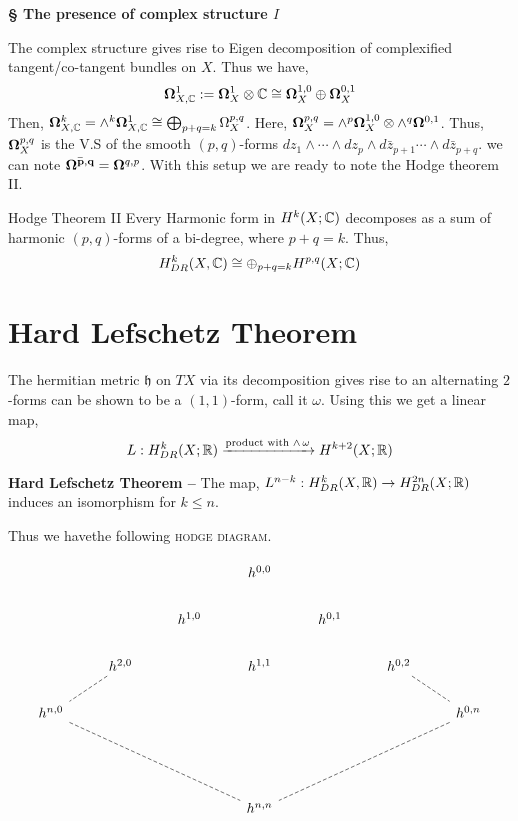 \documentclass[11pt]{article}
\begin{document}
\vspace*{0.2cm}

\noindent \textbf{\textcolor{darkcerulean}{\S}  The presence of complex structure $I$}

\vspace*{0.2cm}

\noindent The complex structure gives rise to  Eigen decomposition of complexified tangent/co-tangent bundles on $X$. Thus we have, 
$$\mathbf{\Omega}^{1}_{X,\mathbb{C}}:= \mathbf{\Omega}^1_{X}\otimes \mathbb{C} \cong \mathbf{\Omega}_X^{1,0} \oplus \mathbf{\Omega}_X^{0,1}$$
Then, $\mathbf{\Omega}_{X,\mathbb{C}}^k= \wedge^k \mathbf{\Omega}^1_{X,\mathbb{C}}\cong \bigoplus_{p+q=k}\Omega^{p,q}_{X}$. Here, $\mathbf{\Omega}_{X}^{p,q} = \wedge^p \mathbf{\Omega}^{1,0}_X \otimes \wedge^q \mathbf{\Omega}^{0,1}$. Thus, $\mathbf{\Omega}_X^{p,q}$ is the V.S of the smooth $(p,q)$-forms $dz_1\wedge\cdots \wedge dz_p \wedge d\bar{z}_{p+1} \cdots \wedge d\bar{z}_{p+q}$. we can note $\bar{\mathbf{\Omega}^{p,q}} = \mathbf{\Omega}^{q,p}$. With this setup we are ready to note the Hodge theorem II. 

\begin{Thm}{Hodge Theorem II}{}
    \hspace*{0.1cm} Every Harmonic form in $H^k(X;\mathbb{C})$ decomposes as a sum of harmonic $(p,q)$-forms of a bi-degree, where $p+q=k$. Thus, \[H^k_{DR}(X,\mathbb{C})\cong \oplus_{p+q=k} H^{p,q}(X;\mathbb{C})\]
\end{Thm}


\section{Hard Lefschetz Theorem}

The hermitian metric $\mathfrak{h}$ on $TX$ via its decomposition gives rise to an alternating $2$-forms can be shown to be a $(1,1)$-form, call it $\omega$. Using this we get a linear map,
 $$L: H^{k}_{DR}(X;\mathbb{R})\xrightarrow{\text{product with }\wedge \, \omega} H^{k+2}(X;\mathbb{R})$$

\noindent \textcolor{darkcerulean}{\textbf{Hard Lefschetz Theorem --}} The map, $L^{n-k}:H^k_{DR}(X,\mathbb{R})\to H^{2n}_{DR}(X;\mathbb{R})$ induces an isomorphism for $k \leq n$. 


Thus we havethe following \textsc{hodge diagram}.

\[\begin{tikzcd}
	&&& {h^{0,0}} \\
	&& {h^{1,0}} && {h^{0,1}} \\
	& {h^{2,0}} && {h^{1,1}} && {h^{0,2}} \\
	{h^{n,0}} &&&&&& {h^{0,n}} \\
	\\
	\\
	&&& {h^{n,n}}
	\arrow[dashed, no head, from=3-2, to=4-1]
	\arrow[dashed, no head, from=3-6, to=4-7]
	\arrow[dashed, no head, from=4-1, to=7-4]
	\arrow[dashed, no head, from=4-7, to=7-4]
\end{tikzcd}\]
\end{document}
